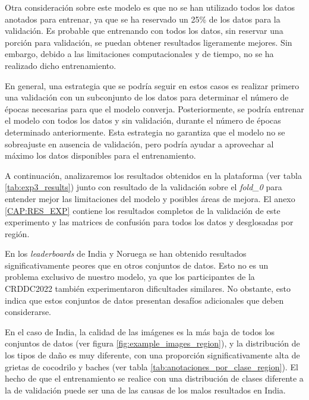 Otra consideración sobre este modelo es que no se han utilizado todos los datos anotados para entrenar, ya que se ha reservado un 25\% de los datos para la validación. Es probable que entrenando con todos los datos, sin reservar una porción para validación, se puedan obtener resultados ligeramente mejores. Sin embargo, debido a las limitaciones computacionales y de tiempo, no se ha realizado dicho entrenamiento.

En general, una estrategia que se podría seguir en estos casos es realizar primero una validación con un subconjunto de los datos para determinar el número de épocas necesarias para que el modelo converja. Posteriormente, se podría entrenar el modelo con todos los datos y sin validación, durante el número de épocas determinado anteriormente. Esta estrategia no garantiza que el modelo no se sobreajuste en ausencia de validación, pero podría ayudar a aprovechar al máximo los datos disponibles para el entrenamiento.

A continuación, analizaremos los resultados obtenidos en la plataforma (ver tabla \ref{tab:exp3_results}) junto con resultado de la validación sobre el \textit{fold\_0} para entender mejor las limitaciones del modelo y posibles áreas de mejora. El anexo \ref{CAP:RES_EXP} contiene los resultados completos de la validación de este experimento y las matrices de confusión para todos los datos y desglosadas por región. 

En los \textit{leaderboards} de India y Noruega se han obtenido resultados significativamente peores que en otros conjuntos de datos. Esto no es un problema exclusivo de nuestro modelo, ya que los participantes de la CRDDC2022 también experimentaron dificultades similares. No obstante, esto indica que estos conjuntos de datos presentan desafíos adicionales que deben considerarse.

En el caso de India, la calidad de las imágenes es la más baja de todos los conjuntos de datos (ver figura \ref{fig:example_images_region}), y la distribución de los tipos de daño es muy diferente, con una proporción significativamente alta de grietas de cocodrilo y baches (ver tabla \ref{tab:anotaciones_por_clase_region}). El hecho de que el entrenamiento se realice con una distribución de clases diferente a la de validación puede ser una de las causas de los malos resultados en India.

